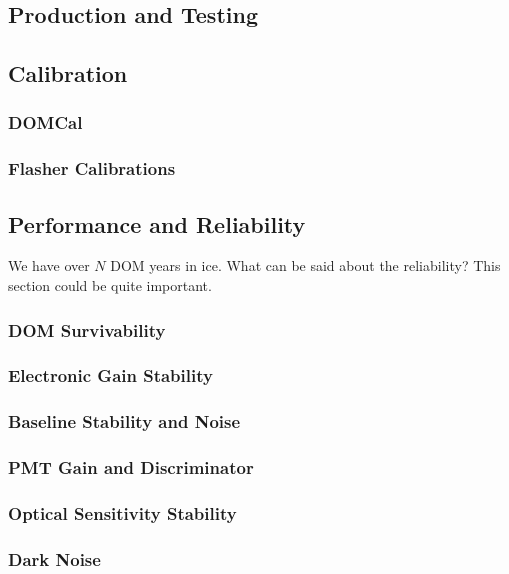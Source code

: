 \subsection{Production and Testing}

\subsection{Calibration}

\subsubsection{DOMCal}

\subsubsection{Flasher Calibrations}

\subsection{Performance and Reliability}
We have over $N$ DOM years in ice.  What can be said about 
the reliability?  This section could be quite important.

\subsubsection{DOM Survivability}

\subsubsection{Electronic Gain Stability}

\subsubsection{Baseline Stability and Noise}

\subsubsection{PMT Gain and Discriminator}

\subsubsection{Optical Sensitivity Stability}

\subsubsection{Dark Noise}

